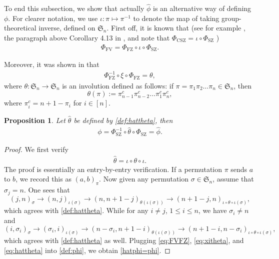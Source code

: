 \documentclass[12pt,reqno]{amsart}
\numberwithin{equation}{section}
\theoremstyle{plain}
\newtheorem{proposition}[theorem]{Proposition}
\theoremstyle{definition}
\def\Sym{\mathfrak{S}}
\def\FV{\mathrm{FV}}
\def\FZ{\mathrm{FZ}}
\def\CSZ{\mathrm{CSZ}}
\def\SZ{\mathrm{SZ}}
\begin{document}
To end this subsection, we show that actually $\widehat\phi$ is an alternative way of defining $\phi$. For clearer notation, we use $\iota:\pi\mapsto\pi^{-1}$ to denote the map of taking group-theoretical inverse, defined on $\Sym_n$. First off, it is known that (see for example \cite{CSZ97}, the paragraph above Corollary 4.13 in \cite{CF23}, and note that $\Phi_{\CSZ}=\iota\circ\Phi_{\SZ}$ \cite[p.~1696]{SZ10})
\begin{align}\label{eq:FVFZ}
\Phi_{\FV}=\Phi_{\FZ}\circ\iota\circ\Phi_{\SZ}.
\end{align}


Moreover, it was shown in \cite[Eq.~(4.34)]{CF23} that
\begin{align}\label{eq:xitheta}
\Phi_{\FZ}^{-1}\circ\xi\circ\Phi_{\FZ} = \theta,
\end{align}
where $\theta:\Sym_n\to \Sym_n$ is an involution defined as follows: if $\pi=\pi_1\pi_2\ldots\pi_n\in\Sym_n$, then
$$\theta(\pi):=\pi^c_{n-1}\pi^c_{n-2}\ldots\pi^c_1\pi^c_n,$$
where $\pi^c_i=n+1-\pi_i$ for $i\in[n]$.

\begin{proposition} Let $\widehat{\theta}$ be defined by \eqref{def:hattheta}, 
then
\begin{align}\label{hatphi=phi}
\phi=\Phi_{\SZ}^{-1}\circ\widehat{\theta}\circ\Phi_{\SZ}=\widehat{\phi}.
\end{align}
\end{proposition}
\begin{proof}   We first verify  
\begin{align}\label{eq:hattheta}
\widehat{\theta}=\iota\circ\theta\circ\iota.
\end{align}
The proof is essentially an entry-by-entry verification. If a permutation $\pi$ sends $a$ to $b$, we record this as $(a,b)_{\pi}$. Now given any permutation $\sigma\in\Sym_n$, assume that $\sigma_j=n$. One sees that
$$(j,n)_{\sigma}\to (n,j)_{\iota(\sigma)}\to (n,n+1-j)_{\theta(\iota(\sigma))}\to (n+1-j,n)_{\iota\circ\theta\circ\iota(\sigma)},$$
which agrees with \eqref{def:hattheta}. While for any $i\neq j$, $1\le i\le n$, we have  $\sigma_i\neq n$ and
$$(i,\sigma_i)_{\sigma}\to (\sigma_i,i)_{\iota(\sigma)}\to (n-\sigma_i,n+1-i)_{\theta(\iota(\sigma))}\to (n+1-i,n-\sigma_i)_{\iota\circ\theta\circ\iota(\sigma)},$$
which agrees with \eqref{def:hattheta} as well. 
Plugging \eqref{eq:FVFZ}, \eqref{eq:xitheta}, and \eqref{eq:hattheta} into \eqref{def:phi}, we obtain \eqref{hatphi=phi}.
\end{proof}
\end{document}
